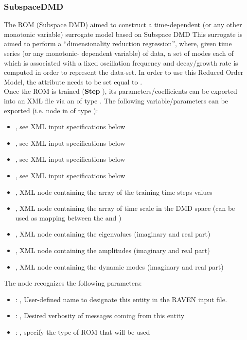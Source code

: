 \subsubsection{SubspaceDMD}
  The  ROM (Subspace DMD) aimed to construct a time-dependent (or any other
  monotonic     variable) surrogate model based on Subspace DMD     This surrogate is aimed to
  perform a ``dimensionality reduction regression'', where, given time     series (or any monotonic-
  dependent variable) of data, a set of modes each of which is associated     with a fixed
  oscillation frequency and decay/growth rate is computed     in order to represent the data-set.
  In order to use this Reduced Order Model, the  attribute      needs
  to be set equal to .     \\     Once the ROM  is trained (\textbf{Step}
  ), its parameters/coefficients can be exported into an XML file     via an
   of type . The following variable/parameters  can be exported
  (i.e.  node     in  of type ):     \begin{itemize}
  \item {}, see XML input specifications below       \item {},
  see XML input specifications below       \item {}, see XML input
  specifications below       \item {}, see XML input specifications below
  \item {}, XML node containing the array of the training time steps values
  \item {}, XML node containing the array of time scale in the DMD space (can be
  used as mapping       between the   and )       \item
  , XML node containing the eigenvalues (imaginary and real part)       \item
  , XML node containing the amplitudes (imaginary and real part)       \item
  , XML node containing the dynamic modes (imaginary and real part)     \end{itemize}

  The  node recognizes the following parameters:
    \begin{itemize}
      \item {}: ,
        User-defined name to designate this entity in the RAVEN input file.
      \item {}: ,
        Desired verbosity of messages coming from this entity
      \item {}: ,
        specify the type of ROM that will be used
  \end{itemize}

